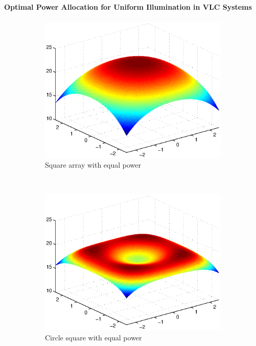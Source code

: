 \documentclass[slidestop,usepdftitle=false]{gvvslides}
\begin{document}
\begin{frame}
\frametitle{\,}
\framesubtitle{Optimal Power Allocation for Uniform Illumination in VLC Systems}
\begin{figure}[!]
\centering
\begin{subfigure}{0.3\columnwidth}
\includegraphics[width=\columnwidth]{c4_sqArr_SNR_Eq}
\caption{Square array with equal power}
\end{subfigure}~
\begin{subfigure}{0.3\columnwidth}
\includegraphics[width=\columnwidth]{c4_cirSq_SNR_Eq}
\caption{Circle square with equal power}
\end{subfigure}~
\begin{subfigure}{0.3\columnwidth}

\end{subfigure}
\end{figure}
\end{frame}
\end{document}
